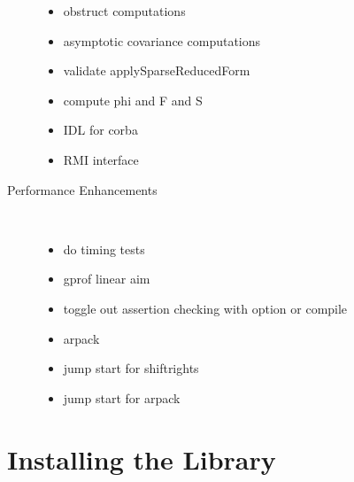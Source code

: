 \documentclass{article}
\begin{document}
\begin{description}
\begin{itemize}
\item obstruct computations
\item asymptotic covariance computations
\item validate applySparseReducedForm
\item compute phi and F and S
\item IDL for corba
\item RMI interface
  \end{itemize}
\item[Performance Enhancements] \ 
  \begin{itemize}
\item do timing tests 
\item gprof linear aim
\item toggle out assertion checking with option or compile
\item arpack
\item jump start for shiftrights
\item jump start for arpack
  \end{itemize}
\end{description}
\section{Installing the Library}
\end{document}
